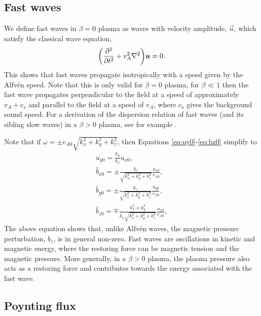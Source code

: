 \subsection{Fast waves}

We define fast waves in $\beta=0$ plasma as waves with velocity amplitude, $\vec{u}$, which satisfy the classical wave equation,
\begin{equation}
    \qty(\pdv[2]{}{t}+v_A^2\laplacian)\vec{u}=0.
\end{equation}
This shows that fast waves propagate isotropically with a speed given by the Alfv\'en speed.
Note that this is only valid for $\beta=0$ plasma, for $\beta\ll 1$ then the fast wave propagates perpendicular to the field at a speed of approximately $v_A + c_s$ and parallel to the field at a speed of $v_A$, where $c_s$ gives the background sound speed. For a derivation of the dispersion relation of fast waves (and its sibling slow waves) in a $\beta>0$ plasma, see for example \citet{Priest2014, Roberts2019}.
 

Note that if $\omega=\pm v_{A0}\sqrt{k_x^2 + k_y^2 + k_z^2}$, then Equations \eqref{eq:uy0}-\eqref{eq:bz0} simplify to
\begin{gather}
    \label{eq:uy0_fast}
    u_{y0}=\frac{k_y}{k_x}u_{x0}, \\
    \label{eq:bx0_fast}
    \hat{b}_{x0} = \pm\frac{k_z}{\sqrt{k_x^2 + k_y^2 + k_z^2}}\frac{u_{x0}}{v_{A0}}, \\
    \label{eq:by0_fast}
    \hat{b}_{y0} = \pm\frac{k_z}{\sqrt{k_x^2 + k_y^2 + k_z^2}}\frac{u_{y0}}{v_{A0}}, \\
    \label{eq:bz0_fast}
    \hat{b}_{z0} = \mp\frac{k_x^2+k_y^2}{k_x\sqrt{k_x^2 + k_y^2 + k_z^2}}\frac{u_{x0}}{v_{A0}},
\end{gather}
The above equation shows that, unlike Alfv\'en waves, the magnetic pressure perturbation, $b_z$, is in general non-zero. Fast waves are oscillations in kinetic and magnetic energy, where the restoring force can be magnetic tension and the magnetic pressure. More generally, in a $\beta>0$ plasma, the plasma pressure also acts as a restoring force and contributes towards the energy associated with the fast wave.

\subsection{Poynting flux}

